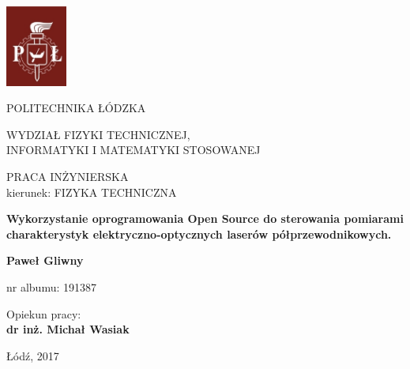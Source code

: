 \begin{titlepage}
 \begin{center}
  \includegraphics[width=0.15\textwidth]{logo.eps}

  \vspace{0.5cm}
  \large{POLITECHNIKA ŁÓDZKA}

  \vspace{1cm}
  \normalsize{WYDZIAŁ FIZYKI TECHNICZNEJ, \\
  INFORMATYKI I MATEMATYKI STOSOWANEJ}

  \vspace{1.5cm}
  \large{PRACA INŻYNIERSKA \\kierunek: FIZYKA TECHNICZNA}

  \vspace{2cm}
  \Large\textbf{{Wykorzystanie oprogramowania Open Source do
    sterowania pomiarami charakterystyk
    elektryczno-optycznych laserów
    półprzewodnikowych.}}

  \vspace{2cm}
  \large\textbf{Paweł Gliwny}

  \large{nr albumu: 191387}

  \vspace{1cm}
  \begin{flushright}
  \large{Opiekun pracy:\\ \textbf{dr inż. Michał Wasiak}}
  \end{flushright}

  \vfill
  \normalsize{Łódź, 2017}
  \end{center}
\end{titlepage}